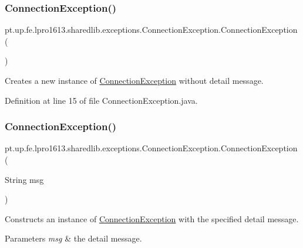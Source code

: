 \subsubsection{\texorpdfstring{Connection\+Exception()}{ConnectionException()}\hspace{0.1cm}{\footnotesize\ttfamily [1/3]}}
{\footnotesize\ttfamily pt.\+up.\+fe.\+lpro1613.\+sharedlib.\+exceptions.\+Connection\+Exception.\+Connection\+Exception (\begin{DoxyParamCaption}{ }\end{DoxyParamCaption})}

Creates a new instance of {\ttfamily \hyperlink{classpt_1_1up_1_1fe_1_1lpro1613_1_1sharedlib_1_1exceptions_1_1_connection_exception}{Connection\+Exception}} without detail message. 

Definition at line 15 of file Connection\+Exception.\+java.

\hypertarget{classpt_1_1up_1_1fe_1_1lpro1613_1_1sharedlib_1_1exceptions_1_1_connection_exception_a7ffdcb8ba15364c95b96154fef1624ee}{}\label{classpt_1_1up_1_1fe_1_1lpro1613_1_1sharedlib_1_1exceptions_1_1_connection_exception_a7ffdcb8ba15364c95b96154fef1624ee} 
\subsubsection{\texorpdfstring{Connection\+Exception()}{ConnectionException()}\hspace{0.1cm}{\footnotesize\ttfamily [2/3]}}
{\footnotesize\ttfamily pt.\+up.\+fe.\+lpro1613.\+sharedlib.\+exceptions.\+Connection\+Exception.\+Connection\+Exception (\begin{DoxyParamCaption}\item[{String}]{msg }\end{DoxyParamCaption})}

Constructs an instance of {\ttfamily \hyperlink{classpt_1_1up_1_1fe_1_1lpro1613_1_1sharedlib_1_1exceptions_1_1_connection_exception}{Connection\+Exception}} with the specified detail message.


\begin{DoxyParams}{Parameters}
{\em msg} & the detail message. \\
\hline
\end{DoxyParams}


